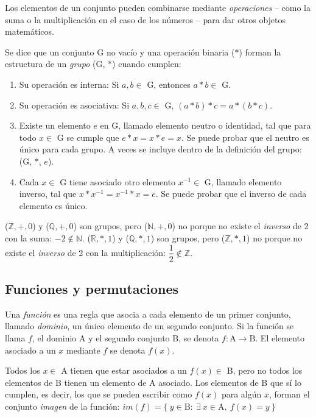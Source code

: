 		Los elementos de un conjunto pueden combinarse mediante \emph{operaciones} -- como la suma o la multiplicación en el caso de los números -- para dar otros objetos matemáticos. 
		
		Se dice que un conjunto G no vacío y una operación binaria ($\ast$) forman la estructura de un \emph{grupo} (G, $\ast$) cuando cumplen:
	
		\begin{enumerate}
			\item{Su operación es interna: Si $a,b\in$ G, entonces $a\ast b\in$ G.}		
			\item{Su operación es asociativa: Si $a,b,c\in$ G, $(a\ast b)\ast c=a\ast(b\ast c)$. }
			\item{Existe un elemento $e$ en G, llamado elemento neutro o identidad, tal que para todo $x\in$ G se cumple que $e\ast x = x\ast e = x$. Se puede probar que el neutro es único para cada grupo. A veces se incluye dentro de la definición del grupo: (G, $\ast$, $e$).}
			\item{Cada $x\in$ G tiene asociado otro elemento $x^{-1}\in$ G, llamado elemento inverso, tal que $x \ast x^{-1} = x^{-1}  \ast x = e$. Se puede probar que el inverso de cada elemento es único.}		
		\end{enumerate}
	
	($\mathbb{Z},+,0$) y ($\mathbb{Q},+,0$) son grupos, pero ($\mathbb{N},+,0$) no porque no existe el \textit{inverso} de 2 con la suma: $-2\notin\mathbb{N}$. ($\mathbb{R},*,1$) y ($\mathbb{Q},*,1$) son grupos, pero ($\mathbb{Z},*,1$) no porque no existe el \textit{inverso} de 2 con la multiplicación: $\dfrac12\notin\mathbb{Z}$.
	
	\subsection{Funciones y permutaciones}
		Una \emph{función} es una regla que asocia a cada elemento de un primer conjunto, llamado \emph{dominio}, un único elemento de un segundo conjunto. Si la función se llama $f$, el dominio A y el segundo conjunto B, se denota $f:\mbox{A}\to \mbox{B}$. El elemento asociado a un $x$ mediante $f$ se denota $f(x)$.
		
		Todos los $x\in$ A tienen que estar asociados a un $f(x)\in$ B, pero no todos los elementos de B tienen un elemento de A asociado. Los elementos de B que sí lo cumplen, es decir, los que se pueden escribir como $f(x)$ para algún $x$, forman el conjunto \emph{imagen} de la función: $im(f)=\{\ y\in \mbox{B}:\ \exists\ x \in \mbox{A},\ f(x)=y\ \}$
		
